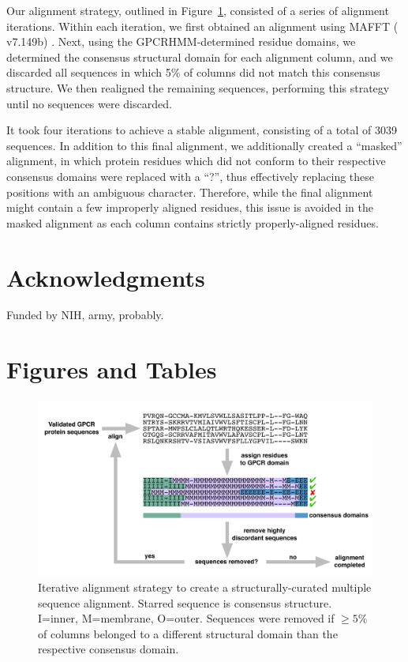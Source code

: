 \documentclass[fleqn,10pt]{wlpeerj}
\begin{document}
Our alignment strategy, outlined in Figure~\ref{flowchart}, consisted of a series of alignment iterations. Within each iteration, we first obtained an alignment using MAFFT ( v7.149b) \cite{mafftv7}. Next, using the GPCRHMM-determined residue domains, we determined the consensus structural domain for each alignment column, and we discarded all sequences in which 5\% of columns did not match this consensus structure. We then realigned the remaining sequences, performing this strategy until no sequences were discarded.

It took four iterations to achieve a stable alignment, consisting of a total of 3039 sequences. In addition to this final alignment, we additionally created a ``masked'' alignment, in which protein residues which did not conform to their respective consensus domains were replaced with a ``?'', thus effectively replacing these positions with an ambiguous character. Therefore, while the final alignment might contain a few improperly aligned residues, this issue is avoided in the masked alignment as each column contains strictly properly-aligned residues.  









\section*{Acknowledgments}

Funded by NIH, army, probably.




\newpage


\section*{Figures and Tables}

\vspace{3cm}

\begin{figure}[htbp]
	\centerline{\includegraphics[width=18cm]{figures/alignment_flowchart.pdf}}
	\caption{\label{flowchart} Iterative alignment strategy to create a structurally-curated multiple sequence alignment. Starred sequence is consensus structure. I=inner, M=membrane, O=outer. Sequences were removed if $\geq 5\%$ of columns belonged to a different structural domain than the respective consensus domain.}
\end{figure}
\end{document}
